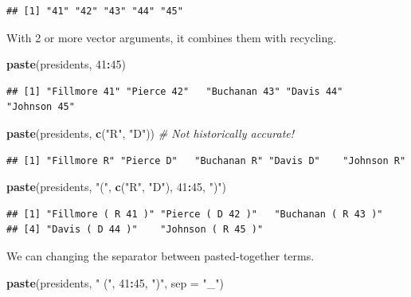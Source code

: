 \documentclass[
]{book}
\newenvironment{Shaded}{\begin{snugshade}}{\end{snugshade}}
\newcommand{\CommentTok}[1]{\textcolor[rgb]{0.56,0.35,0.01}{\textit{#1}}}
\newcommand{\DataTypeTok}[1]{\textcolor[rgb]{0.13,0.29,0.53}{#1}}
\newcommand{\DecValTok}[1]{\textcolor[rgb]{0.00,0.00,0.81}{#1}}
\newcommand{\KeywordTok}[1]{\textcolor[rgb]{0.13,0.29,0.53}{\textbf{#1}}}
\newcommand{\NormalTok}[1]{#1}
\newcommand{\OperatorTok}[1]{\textcolor[rgb]{0.81,0.36,0.00}{\textbf{#1}}}
\newcommand{\StringTok}[1]{\textcolor[rgb]{0.31,0.60,0.02}{#1}}
\begin{document}
\begin{verbatim}
## [1] "41" "42" "43" "44" "45"
\end{verbatim}

With 2 or more vector arguments, it combines them with recycling.

\begin{Shaded}
\begin{Highlighting}[]
\KeywordTok{paste}\NormalTok{(presidents, }\DecValTok{41}\OperatorTok{:}\DecValTok{45}\NormalTok{)}
\end{Highlighting}
\end{Shaded}

\begin{verbatim}
## [1] "Fillmore 41" "Pierce 42"   "Buchanan 43" "Davis 44"    "Johnson 45"
\end{verbatim}

\begin{Shaded}
\begin{Highlighting}[]
\KeywordTok{paste}\NormalTok{(presidents, }\KeywordTok{c}\NormalTok{(}\StringTok{"R"}\NormalTok{, }\StringTok{"D"}\NormalTok{))  }\CommentTok{# Not historically accurate!}
\end{Highlighting}
\end{Shaded}

\begin{verbatim}
## [1] "Fillmore R" "Pierce D"   "Buchanan R" "Davis D"    "Johnson R"
\end{verbatim}

\begin{Shaded}
\begin{Highlighting}[]
\KeywordTok{paste}\NormalTok{(presidents, }\StringTok{"("}\NormalTok{, }\KeywordTok{c}\NormalTok{(}\StringTok{"R"}\NormalTok{, }\StringTok{"D"}\NormalTok{), }\DecValTok{41}\OperatorTok{:}\DecValTok{45}\NormalTok{, }\StringTok{")"}\NormalTok{)}
\end{Highlighting}
\end{Shaded}

\begin{verbatim}
## [1] "Fillmore ( R 41 )" "Pierce ( D 42 )"   "Buchanan ( R 43 )"
## [4] "Davis ( D 44 )"    "Johnson ( R 45 )"
\end{verbatim}

We can changing the separator between pasted-together terms.

\begin{Shaded}
\begin{Highlighting}[]
\KeywordTok{paste}\NormalTok{(presidents, }\StringTok{" ("}\NormalTok{, }\DecValTok{41}\OperatorTok{:}\DecValTok{45}\NormalTok{, }\StringTok{")"}\NormalTok{, }\DataTypeTok{sep =} \StringTok{"_"}\NormalTok{)}
\end{Highlighting}
\end{Shaded}
\end{document}
